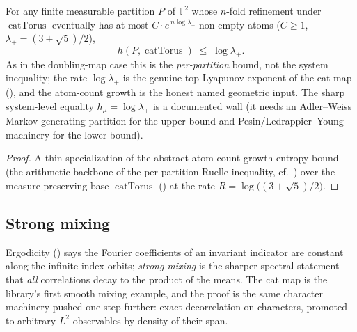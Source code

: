 \begin{theorem}\label{catTorus_ksEntropyPartition_le_logLambda}
  \leanok
  For any finite measurable partition \(P\) of \(\mathbb{T}^2\) whose \(n\)-fold refinement under
  \(\operatorname{catTorus}\) eventually has at most \(C\cdot e^{\,n\log\lambda_+}\) non-empty
  atoms (\(C\ge 1\), \(\lambda_+ = (3+\sqrt5)/2\)),
  \[
    h(P, \operatorname{catTorus}) \;\le\; \log\lambda_+ .
  \]
  As in the doubling-map case this is the \emph{per-partition} bound, not the system inequality;
  the rate \(\log\lambda_+\) is the genuine top Lyapunov exponent of the cat map
  (), and the atom-count growth is the honest
  named geometric input. The sharp system-level equality \(h_\mu = \log\lambda_+\) is a documented
  wall (it needs an Adler--Weiss Markov generating partition for the upper bound and
  Pesin/Ledrappier--Young machinery for the lower bound).
\end{theorem}
\begin{proof}\leanok
  A thin specialization of the abstract atom-count-growth entropy bound (the arithmetic backbone
  of the per-partition Ruelle inequality, cf.\ ) over the
  measure-preserving base \(\operatorname{catTorus}\) () at the
  rate \(R = \log\bigl((3+\sqrt5)/2\bigr)\).
\end{proof}

\subsection{Strong mixing}

Ergodicity () says the Fourier coefficients of an invariant indicator are
constant along the infinite index orbits; \emph{strong mixing} is the sharper spectral statement
that \emph{all} correlations decay to the product of the means. The cat map is the library's first
smooth mixing example, and the proof is the same character machinery pushed one step further: exact
decorrelation on characters, promoted to arbitrary \(L^2\) observables by density of their span.

